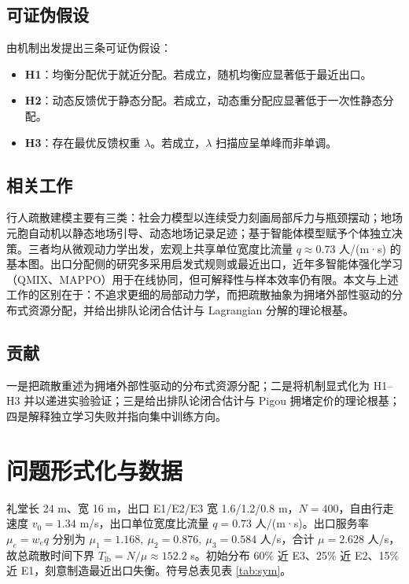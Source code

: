 ﻿\documentclass[withoutpreface,bwprint]{cumcmthesis}
\begin{document}
\subsection{可证伪假设}
由机制出发提出三条可证伪假设：
\begin{itemize}
  \item \textbf{H1}：均衡分配优于就近分配。若成立，随机均衡应显著低于最近出口。
  \item \textbf{H2}：动态反馈优于静态分配。若成立，动态重分配应显著低于一次性静态分配。
  \item \textbf{H3}：存在最优反馈权重 $\lambda$。若成立，$\lambda$ 扫描应呈单峰而非单调。
\end{itemize}

\subsection{相关工作}
行人疏散建模主要有三类：社会力模型以连续受力刻画局部斥力与瓶颈摆动；地场元胞自动机以静态地场引导、动态地场记录足迹；基于智能体模型赋予个体独立决策。三者均从微观动力学出发，宏观上共享单位宽度比流量 $q\approx0.73$ 人/(m·s) 的基本图。出口分配侧的研究多采用启发式规则或最近出口，近年多智能体强化学习（QMIX、MAPPO）用于在线协同，但可解释性与样本效率仍有限。本文与上述工作的区别在于：不追求更细的局部动力学，而把疏散抽象为拥堵外部性驱动的分布式资源分配，并给出排队论闭合估计与 Lagrangian 分解的理论根基。

\subsection{贡献}
一是把疏散重述为拥堵外部性驱动的分布式资源分配；二是将机制显式化为 H1–H3 并以递进实验验证；三是给出排队论闭合估计与 Pigou 拥堵定价的理论根基；四是解释独立学习失败并指向集中训练方向。

\section{问题形式化与数据}
礼堂长 24 m、宽 16 m，出口 E1/E2/E3 宽 1.6/1.2/0.8 m，$N=400$，自由行走速度 $v_0=1.34$ m/s，出口单位宽度比流量 $q=0.73$ 人/(m·s)。出口服务率 $\mu_e=w_e q$ 分别为 $\mu_1=1.168,\ \mu_2=0.876,\ \mu_3=0.584$ 人/s，合计 $\mu=2.628$ 人/s，故总疏散时间下界 $T_{\mathrm{lb}}=N/\mu\approx152.2$ s。初始分布 60\% 近 E3、25\% 近 E2、15\% 近 E1，刻意制造最近出口失衡。符号总表见表 \ref{tab:sym}。
\end{document}
